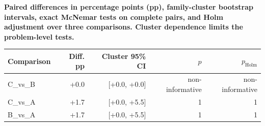 \begin{center}
\textbf{Paired differences in percentage points (pp), family-cluster bootstrap intervals, exact McNemar tests on complete pairs, and Holm adjustment over three comparisons. Cluster dependence limits the problem-level tests.}\par\vspace{3pt}
\small
\begin{tabular}{lrrrr}
\toprule
Comparison & Diff. pp & Cluster 95\% CI & $p$ & $p_{\mathrm{Holm}}$ \\
\midrule
C\_vs\_B & +0.0 & [+0.0, +0.0] & non-informative & non-informative \\
C\_vs\_A & +1.7 & [+0.0, +5.5] & 1 & 1 \\
B\_vs\_A & +1.7 & [+0.0, +5.5] & 1 & 1 \\
\bottomrule
\end{tabular}
\end{center}
